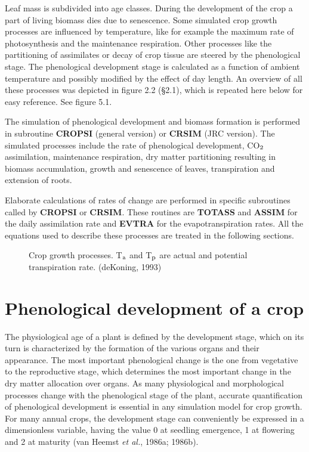 Leaf mass is subdivided into age classes. During the development of the crop a part of
living biomass dies due to senescence. Some simulated crop growth processes are
influenced by temperature, like for example the maximum rate of photosyn\-thesis and the
maintenance respiration. Other processes like the partitioning of assimilates or decay of
crop tissue are steered by the phenological stage. The phenological development stage is
calculated as a function of ambient temperature and possibly modified by the effect of day
length. An overview of all these processes was depicted in figure 2.2 (\S 2.1), which is
repeated here below for easy reference. See figure 5.1.

The simulation of phenological development and biomass formation is performed in
subroutine {\bf CROPSI} (general version) or {\bf CRSIM} (JRC version). The simulated process\-es
include the rate of pheno\-logical develop\-ment, CO$_{{\rm 2}}$ assimilation, mainte\-nance respiration,
dry matter partition\-ing resulting in biomass accumulation, growth and senescence of
leaves, transpiration and extension of roots. 

Elaborate calculations of rates of change are performed in specific subroutines called by
{\bf CROPSI} or {\bf CRSIM}. These routines are {\bf TOTASS} and {\bf ASSIM} for the daily assimilation
rate and {\bf EVTRA} for the evapotranspiration rates. All the equations used to describe these
processes are treated in the following sections.

\begin{figure}[htbp]
\caption{Crop growth pro\-cesses. {\small T$_{{\rm a}}$ and T$_{{\rm p}}$ are actual and potential 
transpiration rate.} (deKoning, 1993)}
 \begin{center} \end{center}
\end{figure}

\section{Phenological development of a crop}

The physio\-logical age of a plant is defined by the development stage, which on its turn is
characterized by the forma\-tion of the various organs and their appear\-ance. The most
important phenological change is the one from vegetative to the reproduc\-tive stage, which
determines the most important change in the dry matter allocation over organs. As many
physiologi\-cal and morphological processes change with the phenological stage of the
plant, accurate quantification of phenological development is essential in any simulation
model for crop growth. For many annual crops, the development stage can conveniently
be expressed in a dimensionless variable, having the value 0 at seedling emergence, 1 at
flowering and 2 at maturity (van Heemst {\it et al.}, 1986a; 1986b). 

